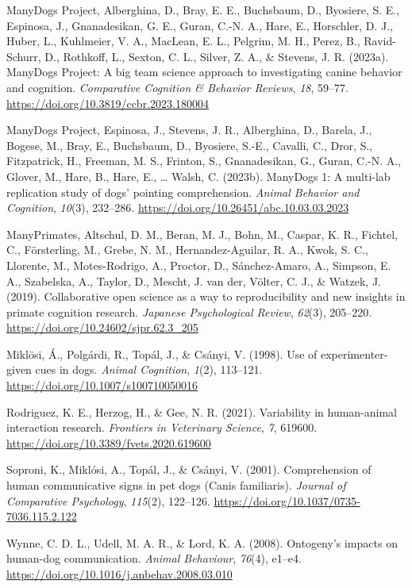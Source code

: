 \documentclass[
  man,floatsintext]{apa6}
\newlength{\cslhangindent}
\newlength{\cslentryspacingunit} %
\newenvironment{CSLReferences}[2] %
 {%
  \setlength{\parindent}{0pt}
  \ifodd #1
  \let\oldpar\par
  \def\par{\hangindent=\cslhangindent\oldpar}
  \fi
  \setlength{\parskip}{#2\cslentryspacingunit}
 }%
 {}
\begin{document}
\begin{CSLReferences}{1}{0}
\leavevmode{}%
ManyDogs Project, Alberghina, D., Bray, E. E., Buchsbaum, D., Byosiere, S. E., Espinosa, J., Gnanadesikan, G. E., Guran, C.-N. A., Hare, E., Horschler, D. J., Huber, L., Kuhlmeier, V. A., MacLean, E. L., Pelgrim, M. H., Perez, B., Ravid-Schurr, D., Rothkoff, L., Sexton, C. L., Silver, Z. A., \& Stevens, J. R. (2023a). {ManyDogs Project}: {A} big team science approach to investigating canine behavior and cognition. \emph{Comparative Cognition \& Behavior Reviews}, \emph{18}, 59--77. \url{https://doi.org/10.3819/ccbr.2023.180004}

\leavevmode{}%
ManyDogs Project, Espinosa, J., Stevens, J. R., Alberghina, D., Barela, J., Bogese, M., Bray, E., Buchsbaum, D., Byosiere, S.-E., Cavalli, C., Dror, S., Fitzpatrick, H., Freeman, M. S., Frinton, S., Gnanadesikan, G., Guran, C.-N. A., Glover, M., Hare, B., Hare, E., \ldots{} Walsh, C. (2023b). {ManyDogs} 1: {A} multi-lab replication study of dogs' pointing comprehension. \emph{Animal Behavior and Cognition}, \emph{10}(3), 232--286. \url{https://doi.org/10.26451/abc.10.03.03.2023}

\leavevmode{}%
ManyPrimates, Altschul, D. M., Beran, M. J., Bohn, M., Caspar, K. R., Fichtel, C., Försterling, M., Grebe, N. M., Hernandez-Aguilar, R. A., Kwok, S. C., Llorente, M., Motes-Rodrigo, A., Proctor, D., Sánchez-Amaro, A., Simpson, E. A., Szabelska, A., Taylor, D., Mescht, J. van der, Völter, C. J., \& Watzek, J. (2019). Collaborative open science as a way to reproducibility and new insights in primate cognition research. \emph{Japanese Psychological Review}, \emph{62}(3), 205--220. \url{https://doi.org/10.24602/sjpr.62.3_205}

\leavevmode{}%
Miklösi, Á., Polgárdi, R., Topál, J., \& Csányi, V. (1998). Use of experimenter-given cues in dogs. \emph{Animal Cognition}, \emph{1}(2), 113--121. \url{https://doi.org/10.1007/s100710050016}

\leavevmode{}%
Rodriguez, K. E., Herzog, H., \& Gee, N. R. (2021). Variability in human-animal interaction research. \emph{Frontiers in Veterinary Science}, \emph{7}, 619600. \url{https://doi.org/10.3389/fvets.2020.619600}

\leavevmode{}%
Soproni, K., Miklósi, A., Topál, J., \& Csányi, V. (2001). Comprehension of human communicative signs in pet dogs ({Canis} familiaris). \emph{Journal of Comparative Psychology}, \emph{115}(2), 122--126. \url{https://doi.org/10.1037/0735-7036.115.2.122}

\leavevmode{}%
Wynne, C. D. L., Udell, M. A. R., \& Lord, K. A. (2008). Ontogeny's impacts on human-dog communication. \emph{Animal Behaviour}, \emph{76}(4), e1--e4. \url{https://doi.org/10.1016/j.anbehav.2008.03.010}

\end{CSLReferences}
\end{document}
